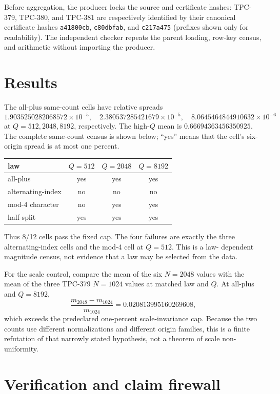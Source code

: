 \documentclass[10pt]{article}
\begin{document}
Before aggregation, the producer locks the source and certificate hashes:
TPC-379, TPC-380, and TPC-381 are respectively identified by their canonical
certificate hashes
\texttt{a41800cb}, \texttt{c80dbfab}, and \texttt{c217a475} (prefixes shown
only for readability).  The independent checker repeats the parent loading,
row-key census, and arithmetic without importing the producer.

\section{Results}

The all-plus same-count cells have relative spreads
\[
 1.9035250282068572\!\times\!10^{-5},\quad
 2.380537285421679\!\times\!10^{-5},\quad
 8.0645464844910632\!\times\!10^{-6}
\]
at \(Q=512,2048,8192\), respectively.  The high-\(Q\) mean is
\(0.66694363456350925\).  The complete same-count census is shown below;
``yes'' means that the cell's six-origin spread is at most one percent.

\begin{center}
\begin{tabular}{lccc}
\toprule
law & \(Q=512\) & \(Q=2048\) & \(Q=8192\)\\
\midrule
all-plus & yes & yes & yes\\
alternating-index & no & no & no\\
mod-4 character & no & yes & yes\\
half-split & yes & yes & yes\\
\bottomrule
\end{tabular}
\end{center}

Thus 8/12 cells pass the fixed cap.  The four failures are exactly the three
alternating-index cells and the mod-4 cell at \(Q=512\).  This is a law-
dependent magnitude census, not evidence that a law may be selected from the
data.

For the scale control, compare the mean of the six \(N=2048\) values with the
mean of the three TPC-379 \(N=1024\) values at matched law and \(Q\).  At
all-plus and \(Q=8192\),
\[
 \frac{m_{2048}-m_{1024}}{m_{1024}}
 =0.020813995160269608,
\]
which exceeds the predeclared one-percent scale-invariance cap.  Because the
two counts use different normalizations and different origin families, this
is a finite refutation of that narrowly stated hypothesis, not a theorem of
scale non-uniformity.

\section{Verification and claim firewall}
\end{document}
